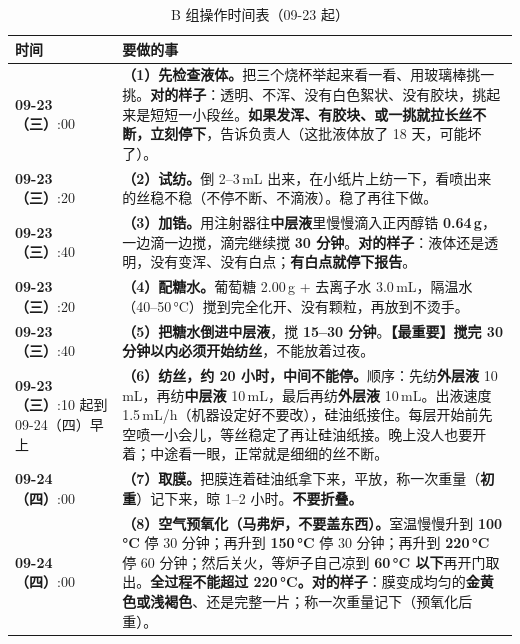 \begin{table}[htbp]
\centering
\caption{B 组操作时间表（09-23 起）}
\begin{tabularx}{\textwidth}{p{2.7cm} X}
\toprule
\textbf{时间} & \textbf{要做的事} \\
\midrule
\textbf{09-23（三）}\newline 09:00 & \textbf{（1）先检查液体。}把三个烧杯举起来看一看、用玻璃棒挑一挑。\textbf{对的样子}：透明、不浑、没有白色絮状、没有胶块，挑起来是短短一小段丝。\textbf{如果发浑、有胶块、或一挑就拉长丝不断，立刻停下}，告诉负责人（这批液体放了 18 天，可能坏了）。\\
\midrule
\textbf{09-23（三）}\newline 09:20 & \textbf{（2）试纺。}倒 2--3\,mL 出来，在小纸片上纺一下，看喷出来的丝稳不稳（不停不断、不滴液）。稳了再往下做。\\
\midrule
\textbf{09-23（三）}\newline 09:40 & \textbf{（3）加锆。}用注射器往\textbf{中层液}里慢慢滴入正丙醇锆 \textbf{0.64\,g}，一边滴一边搅，滴完继续搅 \textbf{30 分钟}。\textbf{对的样子}：液体还是透明，没有变浑、没有白点；\textbf{有白点就停下报告}。\\
\midrule
\textbf{09-23（三）}\newline 10:20 & \textbf{（4）配糖水。}葡萄糖 2.00\,g + 去离子水 3.0\,mL，隔温水（40--50\,°C）搅到完全化开、没有颗粒，再放到不烫手。\\
\midrule
\textbf{09-23（三）}\newline 10:40 & \textbf{（5）把糖水倒进中层液}，搅 \textbf{15--30 分钟}。\textbf{【最重要】搅完 30 分钟以内必须开始纺丝}，不能放着过夜。\\
\midrule
\textbf{09-23（三）}\newline 11:10 起\newline 到 09-24（四）早上 & \textbf{（6）纺丝，约 20 小时，中间不能停。}顺序：先纺\textbf{外层液} 10\,mL，再纺\textbf{中层液} 10\,mL，最后再纺\textbf{外层液} 10\,mL。出液速度 1.5\,mL/h（机器设定好不要改），硅油纸接住。每层开始前先空喷一小会儿，等丝稳定了再让硅油纸接。晚上没人也要开着；中途看一眼，正常就是细细的丝不断。\\
\midrule
\textbf{09-24（四）}\newline 07:00 & \textbf{（7）取膜。}把膜连着硅油纸拿下来，平放，称一次重量（\textbf{初重}）记下来，晾 1--2 小时。\textbf{不要折叠。}\\
\midrule
\textbf{09-24（四）}\newline 14:00 & \textbf{（8）空气预氧化（马弗炉，不要盖东西）。}室温慢慢升到 \textbf{100\,°C} 停 30 分钟；再升到 \textbf{150\,°C} 停 30 分钟；再升到 \textbf{220\,°C} 停 60 分钟；然后关火，等炉子自己凉到 \textbf{60\,°C 以下}再开门取出。\textbf{全过程不能超过 220\,°C。}\textbf{对的样子}：膜变成均匀的\textbf{金黄色或浅褐色}、还是完整一片；称一次重量记下（预氧化后重）。\\

\end{tabularx}
\end{table}
